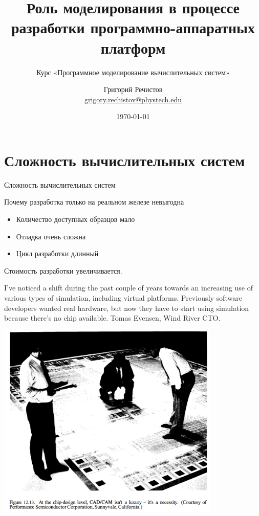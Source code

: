 \documentclass{beamer}
\title{Роль моделирования в процессе разработки программно-аппаратных платформ}
\subtitle{Курс «Программное моделирование вычислительных систем»}
\author[Григорий Речистов]{Григорий Речистов \\ \small{\href{mailto:grigory.rechistov@phystech.edu}{grigory.rechistov@phystech.edu}}}
\date{\today}
\begin{document}
\begin{frame}
    \maketitle
\end{frame}

\begin{frame}
    \tableofcontents
\end{frame}

\section{Сложность вычислительных систем}

\begin{frame}{Сложность вычислительных систем}

\end{frame}

\begin{frame}{Почему разработка только на реальном железе невыгодна }

\begin{itemize}
\item Количество доступных образцов мало
\item Отладка очень сложна
\item Цикл разработки длинный
\end{itemize}

Стоимость разработки увеличивается.

I've noticed a shift during the past couple of years towards an increasing use of various types of simulation, including virtual platforms. Previously software developers wanted real hardware, but now they have to start using simulation because there's no chip available. Tomas Evensen, Wind River CTO.

\end{frame}

\begin{frame}
\centering

\includegraphics[width=0.8\textwidth]{ic-floor}


\end{frame}
\end{document}
